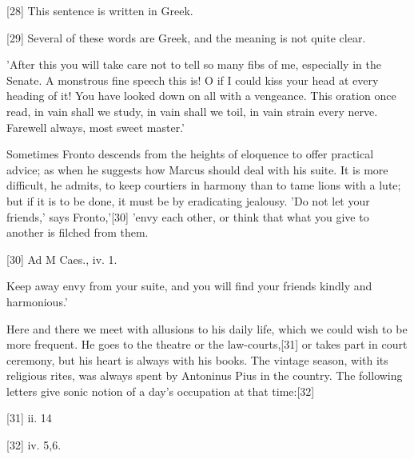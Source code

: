 [28]
This sentence is written in Greek.

[29]
Several of these words are Greek, and the meaning is not quite clear.

'After this you will take care not to tell so many fibs of me, especially
in the Senate. A monstrous fine speech this is! O if I could kiss your
head at every heading of it! You have looked down on all with a vengeance.
This oration once read, in vain shall we study, in vain shall we toil, in
vain strain every nerve. Farewell always, most sweet master.'

Sometimes Fronto descends from the heights of eloquence to offer practical
advice; as when he suggests how Marcus should deal with his suite. It is
more difficult, he admits, to keep courtiers in harmony than to tame lions
with a lute; but if it is to be done, it must be by eradicating jealousy.
'Do not let your friends,' says Fronto,'[30]
'envy each other, or think that what you give to another is filched from
them.

[30]
Ad M Caes., iv. 1.

Keep away envy from your suite, and you will find your friends kindly and
harmonious.'

Here and there we meet with allusions to his daily life, which we could
wish to be more frequent. He goes to the theatre or the law-courts,[31]
or takes part in court ceremony, but his heart is always with his
books. The vintage season, with its religious rites, was always
spent by Antoninus Pius in the country. The following letters
give sonic notion of a day's occupation at that time:[32]

[31]
ii. 14

[32]
iv. 5,6.

